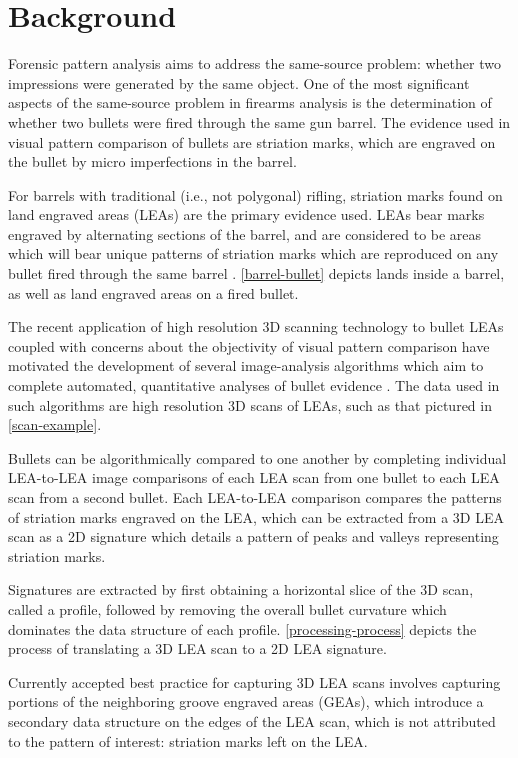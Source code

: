 \documentclass[12pt]{article}
\begin{document}
\section{Background}

Forensic pattern analysis aims to address the same-source problem:
whether two impressions were generated by the same object. One of the
most significant aspects of the same-source problem in firearms analysis
is the determination of whether two bullets were fired through the same
gun barrel. The evidence used in visual pattern comparison of bullets
are striation marks, which are engraved on the bullet by micro
imperfections in the barrel.

For barrels with traditional (i.e., not polygonal) rifling, striation
marks found on land engraved areas (LEAs) are the primary evidence used.
LEAs bear marks engraved by alternating sections of the barrel, and are
considered to be areas which will bear unique patterns of striation
marks which are reproduced on any bullet fired through the same barrel
\cite{AFTE}. \autoref{barrel-bullet} depicts lands inside a barrel, as
well as land engraved areas on a fired bullet.

The recent application of high resolution 3D scanning technology to
bullet LEAs coupled with concerns about the objectivity of visual
pattern comparison have motivated the development of several
image-analysis algorithms which aim to complete automated, quantitative
analyses of bullet evidence
\citep[see][]{DeKinder1, DeKinder2, Bachrach1, Ma1, Chu1, Chu2, Hare1}.
The data used in such algorithms are high resolution 3D scans of LEAs,
such as that pictured in \autoref{scan-example}.

Bullets can be algorithmically compared to one another by completing
individual LEA-to-LEA image comparisons of each LEA scan from one bullet
to each LEA scan from a second bullet. Each LEA-to-LEA comparison
compares the patterns of striation marks engraved on the LEA, which can
be extracted from a 3D LEA scan as a 2D signature which details a
pattern of peaks and valleys representing striation marks.

Signatures are extracted by first obtaining a horizontal slice of the 3D
scan, called a profile, followed by removing the overall bullet
curvature which dominates the data structure of each profile.
\autoref{processing-process} depicts the process of translating a 3D LEA
scan to a 2D LEA signature.

Currently accepted best practice for capturing 3D LEA scans involves
capturing portions of the neighboring groove engraved areas (GEAs),
which introduce a secondary data structure on the edges of the LEA scan,
which is not attributed to the pattern of interest: striation marks left
on the LEA.
\end{document}
